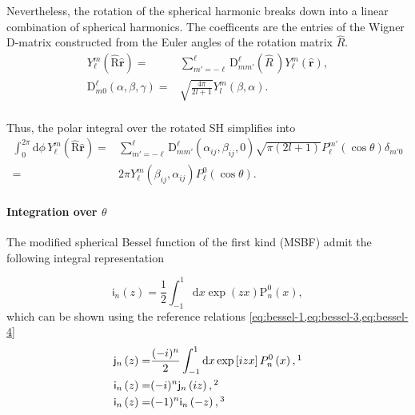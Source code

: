 \documentclass[
journal=jctcce, %
manuscript=article, layout=onecolumn]{achemso}
\begin{document}
Nevertheless, the rotation of the spherical harmonic breaks down into a linear combination of spherical harmonics. The coefficents are the entries of the Wigner D-matrix constructed from the Euler angles of the rotation matrix $\hat{R}$.
\begin{equation}
\begin{split}
Y_{\ell}^{m}\left(\hat{\mathrm{R}}\hat{\mathbf{r}}\right) = & \sum_{m'=-\ell}^{\ell} \mathrm{D}_{mm'}^\ell\left(\hat{R}\,\right) Y_{\ell}^{m}\left(\hat{\mathbf{r}}\right), \\
\mathrm{D}_{m0}^\ell\left(\alpha,\beta,\gamma\right) =& \sqrt{\frac{4\pi}{2l+1}} Y_l^m\left(\beta,\alpha\right). \\
\end{split}
\end{equation}


Thus, the polar integral over the rotated SH simplifies into  
\begin{equation}
\begin{split}
\int_0^{2\pi}\mathrm{d}\phi\, Y_{\ell}^{m}\left(\hat{\mathrm{R}}\hat{\mathbf{r}}\right) =& \sum_{m'=-\ell}^{\ell} \mathrm{D}_{mm'}^\ell\left(\alpha_{ij},\beta_{ij},0\right) \sqrt{\pi(2l+1)} P_{\ell}^{m'}\left(\cos{\theta}\right) \delta_{m'0} \\
=& 2\pi Y_\ell^m \left(\beta_{ij},\alpha_{ij}\right) P_{\ell}^{0}\left(\cos{\theta}\right).
\end{split}
\label{eq:int-phi}
\end{equation}

\paragraph{Integration over $\theta$}

The modified spherical Bessel function of the first kind (MSBF) admit the following integral representation

\begin{equation}
    \mathsf{i}_n\left(z\right)= \frac{1}{2}\int_{-1}^{1}\mathrm{d}x \exp\left(zx\right)\mathrm{P}_{n}^{0}\left(x\right),
\end{equation}
which can be shown using the reference relations \cref{eq:bessel-1,eq:bessel-3,eq:bessel-4} 
\begin{align}
\mathsf{j}_n\left(z\right) =& \frac{(-i)^n}{2}\int_{-1}^{1}\mathrm{d}x \exp\left[izx\right]P_{n}^{0}\left(x\right),\footnotemark[1] \label{eq:bessel-1}\\
\mathsf{i}_n\left(z\right)=& (-i)^{n} \mathsf{j}_n\left(iz\right),\footnotemark[2] \label{eq:bessel-3}\\
\mathsf{i}_n\left(z\right)=& (-1)^{n} \mathsf{i}_n\left(-z\right),\footnotemark[3] \label{eq:bessel-4}
\end{align}
\end{document}
